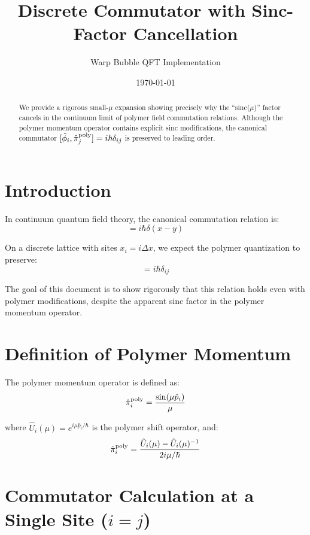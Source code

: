 \documentclass[11pt]{article}
\title{Discrete Commutator with Sinc-Factor Cancellation}
\author{Warp Bubble QFT Implementation}
\date{\today}
\begin{document}
\maketitle

\begin{abstract}
We provide a rigorous small-$\mu$ expansion showing precisely why the ``sinc($\mu$)'' factor cancels in the continuum limit of polymer field commutation relations. Although the polymer momentum operator contains explicit sinc modifications, the canonical commutator $[\hat{\phi}_i, \hat{\pi}_j^{\rm poly}] = i\hbar\delta_{ij}$ is preserved to leading order.
\end{abstract}

\section{Introduction}

In continuum quantum field theory, the canonical commutation relation is:
\begin{equation}
[\hat{\phi}(x), \hat{\pi}(y)] = i\hbar\delta(x-y)
\end{equation}

On a discrete lattice with sites $x_i = i\Delta x$, we expect the polymer quantization to preserve:
\begin{equation}
[\hat{\phi}_i, \hat{\pi}_j^{\rm poly}] = i\hbar\delta_{ij}
\end{equation}

The goal of this document is to show rigorously that this relation holds even with polymer modifications, despite the apparent sinc factor in the polymer momentum operator.

\section{Definition of Polymer Momentum}

The polymer momentum operator is defined as:
\begin{equation}
\hat{\pi}_i^{\rm poly} = \frac{\sin(\mu\hat{p}_i)}{\mu}
\end{equation}

where $\hat{U}_i(\mu) = e^{i\mu\hat{p}_i/\hbar}$ is the polymer shift operator, and:
\begin{equation}
\hat{\pi}_i^{\rm poly} = \frac{\hat{U}_i(\mu) - \hat{U}_i(\mu)^{-1}}{2i\mu/\hbar}
\end{equation}

\section{Commutator Calculation at a Single Site ($i=j$)}
\end{document}
